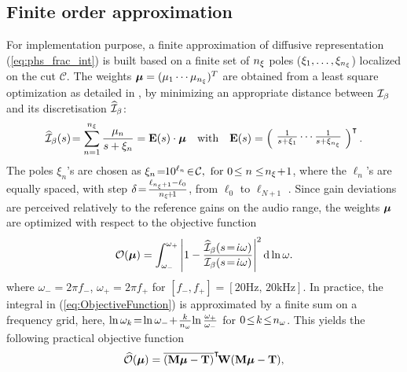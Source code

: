 \documentclass[10pt,a4paper]{article}
\begin{document}
\subsection{Finite order approximation}
\label{sec:Finite_order_approximation}
For implementation purpose, a finite approximation of
diffusive representation (\ref{eq:phs_frac_int}) is built based on a
finite set of ${n_\xi}$ poles ($\xi_1, \dots, \xi_{n_\xi}$) localized on the cut $\mathcal{C}$.
The weights $\boldsymbol{\mu}=(\mu_1\cdots\mu_{n_\xi})^T$ are obtained from a least square optimization as detailed in \cite[sec. 5.1.2]{helie2006diffusive}, by minimizing an appropriate distance between ${\mathcal{I}}_\beta$ and its discretisation $\widehat{{\mathcal{I}}}_\beta$:
\begin{equation}
  \label{eq:ApproxHaMatrix}
  \widehat{{\mathcal{I}}}_\beta(s) \!= \sum_{n=1}^{n_\xi} \frac{\mu_n}{s+\xi_n} = \mathbf{E}(s)\cdot \boldsymbol{\mu} \quad \mbox{with}\quad \mathbf{E}(s)=
  \left(\!
     \begin{array}{c}
      \frac{1}{s+\xi_1} \cdots  \frac{1}{s+\xi_{n_\xi}}
     \end{array}
    \!\right)^\intercal.
\end{equation}										%
The poles $\xi_n$'s are chosen as $\xi_n  \!= \!\! 10^{\ell_n} \!\in\!\cC,
\mbox{~for~} 
0\!\leq n \leq\! \npoles\!+\!1$,
where the $\ell_n$'s are equally spaced, with step
$\delta\!=\!\frac{\ell_{{n_\xi}+1}-\ell_0}{{n_\xi}\!+\!1}$, from $\ell_0$ to
$\ell_{N+1}$ .
Since gain deviations are perceived relatively to
  the reference gains on the audio range, the weights $\boldsymbol{\mu}$ are optimized with respect to the objective function
\begin{equation}
  \label{eq:ObjectiveFunction}
  \mathcal{O}(\boldsymbol{\mu}) = \int_{\omega_{-}}^{\omega_{+}} \left|1-\frac{\widehat{{\mathcal{I}}}_\beta(s\!=\!{\dot\iota}\omega)}{{{\mathcal{I}}}_\beta (s\!=\!{\dot\iota}\omega)} \right|^2 \mathrm{d}\ln \omega.
\end{equation}
where $\omega_{-}=2\pi f_{-}$, $\omega_{+}=2\pi f_{+}$ for $[f_{-},f_{+}]=[20\mbox{Hz},\,20\mbox{kHz}]$.
%
In practice, the integral in (\ref{eq:ObjectiveFunction})
is approximated by a finite sum on a frequency grid,
here, $\ln \omega_k\!=\!\ln \omega_{-}\!  +\!  \frac{k}{{n_\omega}}
\!\ln\frac{\omega_{+}}{\omega_{-}}$ for $0\!\leq\! k\!\leq\!{n_\omega}$.
This yields the following practical objective function
\begin{equation}
  \widehat{\mathcal{O}}(\boldsymbol{\mu}) 
=  {\overline{(\bf M \boldsymbol{\mu} - \mathbf{T})}^\intercal}\!  {\mathbf{W}} (\bf M \boldsymbol{\mu} - \mathbf{T}),
  \label{eq:ObjectiveFunctionNum}
\end{equation}
\end{document}
